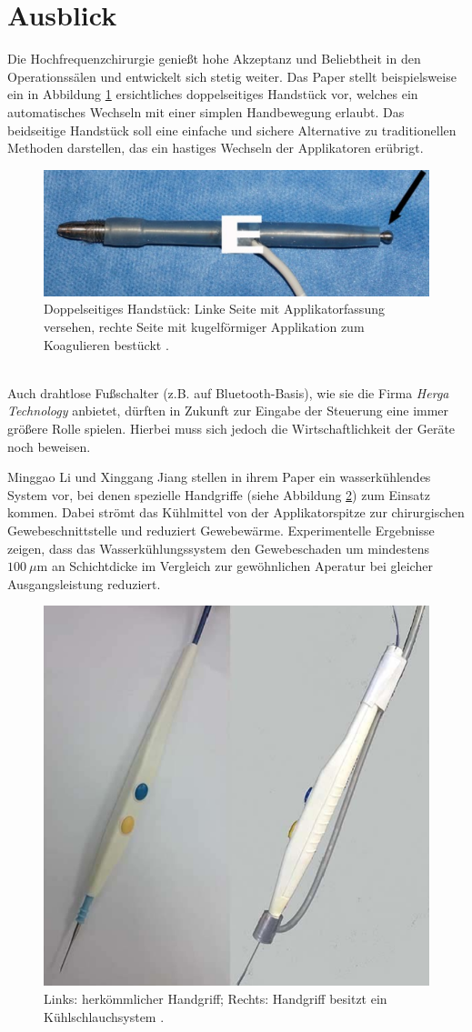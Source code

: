 \documentclass[letterpaper,12pt]{article}
\begin{document}
	\section{Ausblick}
	 
		Die Hochfrequenzchirurgie genießt hohe Akzeptanz und Beliebtheit in den Operationssälen und entwickelt sich stetig weiter. Das Paper \cite{dual} stellt beispielsweise ein in Abbildung \ref{fig:dual} ersichtliches doppelseitiges Handstück vor, welches ein automatisches Wechseln mit einer simplen Handbewegung erlaubt. Das beidseitige Handstück soll eine einfache und sichere Alternative zu traditionellen Methoden darstellen, das ein hastiges Wechseln der Applikatoren erübrigt.
		\begin{figure}[ht] 
			\centering
			\includegraphics[width=0.35\columnwidth]{images/dual.png}
			\caption{Doppelseitiges Handstück: Linke Seite mit Applikatorfassung versehen, rechte Seite mit kugelförmiger Applikation zum Koagulieren bestückt \cite{dual}.}
			\label{fig:dual}
		\end{figure}\\
		Auch drahtlose Fußschalter (z.B. auf Bluetooth-Basis), wie sie die Firma \emph{Herga Technology} anbietet, dürften in Zukunft zur Eingabe der Steuerung eine immer größere Rolle spielen. Hierbei muss sich jedoch die Wirtschaftlichkeit der Geräte noch beweisen.
		
		Minggao Li und Xinggang Jiang stellen in ihrem Paper \cite{waterCool} ein wasserkühlendes System vor, bei denen spezielle Handgriffe (siehe Abbildung \ref{fig:waterCool}) zum Einsatz kommen. Dabei strömt das Kühlmittel von der Applikatorspitze zur chirurgischen Gewebeschnittstelle und reduziert Gewebewärme. Experimentelle Ergebnisse zeigen, dass das Wasserkühlungssystem den Gewebeschaden um mindestens $\SI{100}{\mu\meter}$ an Schichtdicke im Vergleich zur gewöhnlichen Aperatur bei gleicher Ausgangsleistung reduziert.
		\begin{figure}[h!] 
			\centering
			\includegraphics[width=0.3\columnwidth]{images/waterCool.png}
			\caption{Links: herkömmlicher Handgriff; Rechts: Handgriff besitzt ein Kühlschlauchsystem \cite{waterCool}.}
			\label{fig:waterCool}
		\end{figure}
		
\end{document}
